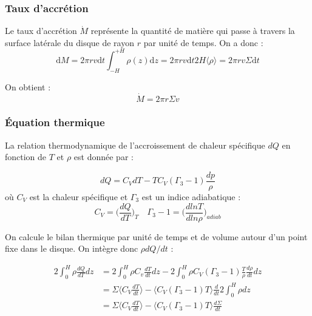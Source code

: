 \documentclass[a4paper,12pt]{article}
\begin{document}
\subsubsection{Taux d'accrétion}

Le taux d'accrétion $\dot M$ représente la quantité de matière qui passe à travers la surface latérale du disque de rayon $r$ par unité de temps. On a donc :
\begin{equation*}
    \text{d}M = 2 \pi rv\text{d}t \int_{-H}^{+H} \rho (z) \text{d}z = 2 \pi rv \text{d}t 2 H \langle \rho \rangle = 2 \pi rv \Sigma \text{d}t
\end{equation*}

On obtient : 
\begin{equation*}
    \dot M = 2 \pi r \Sigma v
\end{equation*}

\subsubsection{Équation thermique}

La relation thermodynamique de l'accroissement de chaleur spécifique $dQ$ en fonction de $T$ et $\rho$ est donnée par :

\begin{equation}
    dQ=C_V dT - TC_V (\Gamma_3 -1) \frac{dp}{\rho}
\end{equation}
où $C_V$ est la chaleur spécifique et $\Gamma_3$ est un indice adiabatique :
\begin{equation}
    C_V=\Big( \frac{dQ}{dT} \Big)_T \quad \Gamma_3-1=\Big( \frac{d lnT}{d ln\rho} \Big)_{adiab}
\end{equation}

On calcule le bilan thermique par unité de temps et de volume autour d'un point fixe dans le disque. On intègre donc $\rho dQ/dt$ :

\begin{equation*}
    \begin{split}
        2 \int_0^H \rho\frac{dQ}{dT} dz &= 2 \int_0^H \rho C_v \frac{dT}{dt}dz - 2\int_0^H \rho C_V(\Gamma_3-1)\frac{T}{\rho}\frac{d\rho}{dt} dz\\
        &=\Sigma \langle C_V \frac{dT}{dt} \rangle - \langle C_V (\Gamma_3-1)T\rangle\frac{d}{dt}2 \int_0^H \rho dz\\
        &=\Sigma \langle C_V \frac{dT}{dt} \rangle - \langle C_V(\Gamma_3-1) T\rangle \frac{d\Sigma}{dt}
    \end{split}
\end{equation*}
\end{document}
